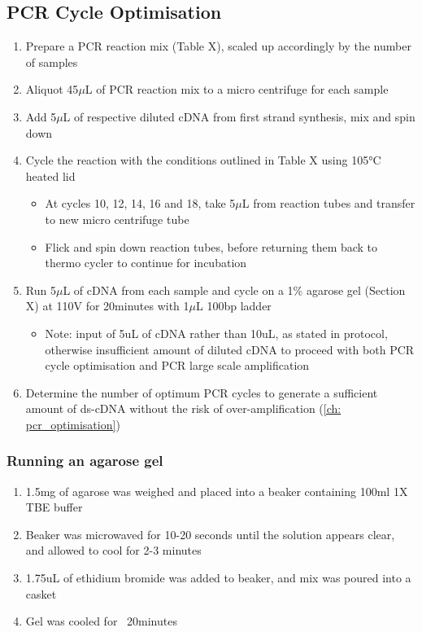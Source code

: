 \subsection{PCR Cycle Optimisation} 
\begin{enumerate}
	\item Prepare a PCR reaction mix (Table X), scaled up accordingly by the number of samples
	\item Aliquot 45$\mu$L of PCR reaction mix to a micro centrifuge for each sample 
	\item Add 5$\mu$L of respective diluted cDNA from first strand synthesis, mix and spin down 
	\item Cycle the reaction with the conditions outlined in Table X using 105°C heated lid
	\begin{itemize}
		\item At cycles 10, 12, 14, 16 and 18, take 5$\mu$L from reaction tubes and transfer to new micro centrifuge tube
		\item Flick and spin down reaction tubes, before returning them back to thermo cycler to continue for incubation  
	\end{itemize}
	\item Run 5$\mu$L of cDNA from each sample and cycle on a 1\% agarose gel (Section X) at 110V for 20minutes with 1$\mu$L 100bp ladder
	\begin{itemize}
		\item Note: input of 5uL of cDNA rather than 10uL, as stated in protocol, otherwise insufficient amount of diluted cDNA to proceed with both PCR cycle optimisation and PCR large scale amplification
	\end{itemize} 
	\item Determine the number of optimum PCR cycles to generate a sufficient amount of ds-cDNA without the risk of over-amplification (\cref{ch: pcr_optimisation})
\end{enumerate} 
	
\subsubsection{Running an agarose gel}
\label{Isoseq_Protocol_running_agarose_gel}
\begin{enumerate}
	\item 1.5mg of agarose was weighed and placed into a beaker containing 100ml 1X TBE buffer 
	\item Beaker was microwaved for 10-20 seconds until the solution appears clear, and allowed to cool for 2-3 minutes 
	\item 1.75uL of ethidium bromide was added to beaker, and mix was poured into a casket 
	\item Gel was cooled for ~20minutes
\end{enumerate} 

